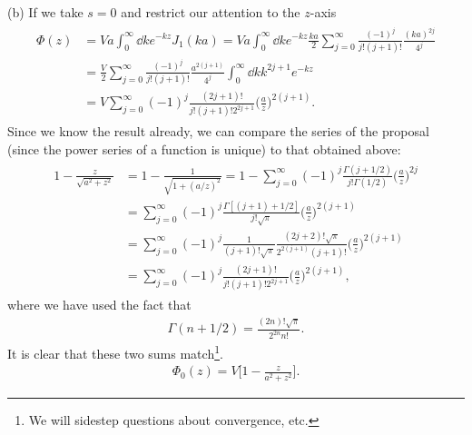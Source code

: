 {(b) If we take $s = 0$ and restrict our attention to the $z$-axis
\begin{eqnarray}
\begin{aligned}
    \Phi(z) &= Va \int_{0}^{\infty} \dd{k} e^{-kz} J_1(ka) = Va \int_{0}^{\infty} \dd{k} e^{-kz} \frac{ka}{2} \sum_{j=0}^{\infty} \frac{(-1)^{j}}{j! (j+1)!} \frac{(ka)^{2j}}{4^{j}} \\
            &= \frac{V}{2} \sum_{j=0}^{\infty} \frac{(-1)^{j}}{j!(j+1)!} \frac{a^{2(j+1)}}{4^{j}} \int_{0}^{\infty} \dd{k} k^{2j+1} e^{-kz} \\
            &= V \sum_{j=0}^{\infty} (-1)^{j}\frac{(2j+1)!}{j!(j+1)!2^{2j+1}} \Big( \frac{a}{z} \Big)^{2(j+1)}
.\end{aligned}
\end{eqnarray}
Since we know the result already, we can compare the series of the proposal (since the power series of a function is unique) to that obtained above:
\begin{eqnarray}
\begin{aligned}
    1 - \frac{z}{\sqrt{a^2 + z^2}} &= 1 - \frac{1}{\sqrt{1 + (a/z)^2}} = 1 - \sum_{j=0}^{\infty} (-1)^{j} \frac{\Gamma(j+1/2)}{j! \Gamma(1/2)} \Big( \frac{a}{z} \Big)^{2j} \\
    &= \sum_{j=0}^{\infty} (-1)^{j} \frac{\Gamma[(j+1)+1/2]}{j!\sqrt{\pi}} \Big( \frac{a}{z} \Big)^{2(j+1)} \\
    &= \sum_{j=0}^{\infty} (-1)^{j} \frac{1}{(j+1)!\sqrt{\pi}} \frac{(2j+2)!\sqrt{\pi}}{2^{2(j+1)}(j+1)!} \Big( \frac{a}{z} \Big)^{2(j+1)} \\
    &= \sum_{j=0}^{\infty} (-1)^{j} \frac{(2j+1)!}{j!(j+1)! 2^{2j+1}} \Big( \frac{a}{z} \Big)^{2(j+1)}
,\end{aligned}
\end{eqnarray}
where we have used the fact that 
\begin{eqnarray}
    \Gamma(n+1/2) = \frac{(2n)!\sqrt{\pi}}{2^{2n}n!}
.\end{eqnarray}
It is clear that these two sums match\footnote{We will sidestep questions about convergence, etc.}. 
\begin{eqnarray}
    \Phi_0(z) = V \Big[ 1 - \frac{z}{a^2 + z^2} \Big]
.\end{eqnarray}

}



